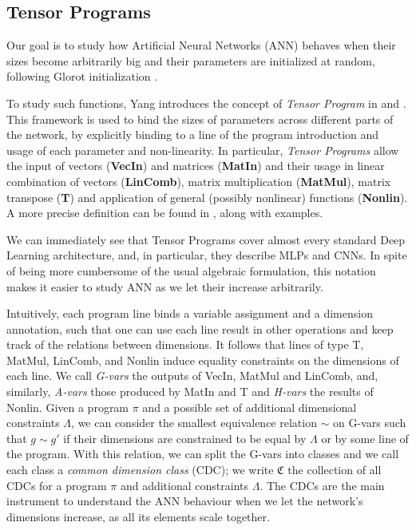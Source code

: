 \documentclass[11pt,notitlepage]{article}
\numberwithin{equation}{section}
\theoremstyle{remark}
\theoremstyle{definition}
\begin{document}
	\subsection{Tensor Programs}\label{subsec:tensorProg}
	
	Our goal is to study how Artificial Neural Networks (ANN) behaves when their sizes become arbitrarily big and their parameters are initialized at random, following Glorot initialization \cite{glorot2010understanding}.
	
	To study such functions, Yang introduces the concept of \emph{Tensor Program} in \cite{yang2019scaling} and \cite{yang2019tensor}.
	This framework is used to bind the sizes of parameters across different parts of the network, by explicitly binding to a line of the program introduction and usage of each parameter and non-linearity.
	In particular, \emph{Tensor Programs} allow the input of vectors (\textbf{VecIn}) and matrices (\textbf{MatIn}) and their usage in linear combination of vectors (\textbf{LinComb}), matrix multiplication (\textbf{MatMul}), matrix transpose (\textbf{T}) and application of general (possibly nonlinear) functions (\textbf{Nonlin}).
	A more precise definition can be found in \cite[Section 3]{yang2019scaling}, along with examples.
	
	We can immediately see that Tensor Programs cover almost every standard Deep Learning architecture, and, in particular, they describe MLPs and CNNs.
	In spite of being more cumbersome of the usual algebraic formulation, this notation makes it easier to study ANN as we let their increase arbitrarily.
	
	Intuitively, each program line binds a variable assignment and a dimension annotation, such that one can use each line result in other operations and keep track of the relations between dimensions.
	It follows that lines of type T, MatMul, LinComb, and Nonlin induce equality constraints on the dimensions of each line.
	We call \emph{G-vars} the outputs of VecIn, MatMul and LinComb, and, similarly, \emph{A-vars} those produced by MatIn and T and \emph{H-vars} the results of Nonlin.
	Given a program $\pi$ and a possible set of additional dimensional constraints $\Lambda$, we can consider the smallest equivalence relation $\sim$ on G-vars such that $g \sim g'$ if their dimensions are constrained to be equal by $\Lambda$ or by some line of the program.
	With this relation, we can split the G-vars into classes and we call each class a \emph{common dimension class} (CDC); we write $\mathfrak{C}$ the collection of all CDCs for a program $\pi$ and additional constraints $\Lambda$.
	The CDCs are the main instrument to understand the ANN behaviour when we let the network's dimensions increase, as all its elements scale together.
	
\end{document}
